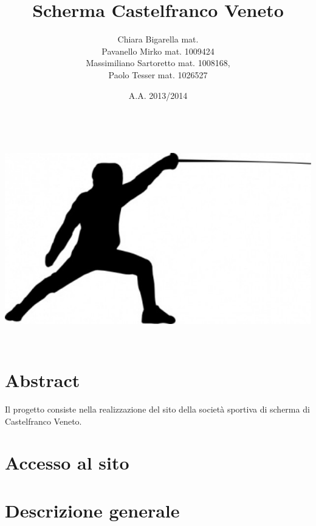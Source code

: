 
	
\title{\bfseries Scherma Castelfranco Veneto}
\author{Chiara Bigarella mat. \\Pavanello Mirko mat. 1009424 \\Massimiliano Sartoretto mat. 1008168,\\ Paolo Tesser mat. 1026527}
\date{A.A. 2013/2014}


\maketitle
\vspace {20 mm}
\includegraphics[width=150mm, height=90mm]{images/frontImage.png}

\pagestyle{romano}
\newpage
	\tableofcontents
\newpage
	\listoffigures
\newpage
{}
\pagestyle{std}

\section{Abstract}
Il progetto consiste nella realizzazione del sito della societ\`a sportiva di scherma di Castelfranco Veneto.

\newpage
\section{Accesso al sito}
	

\newpage
\section{Descrizione generale}
	
	
